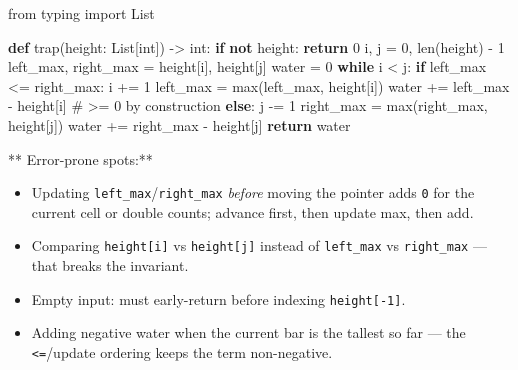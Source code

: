 \documentclass[11pt]{article}
\providecommand{\tightlist}{\setlength{\itemsep}{1pt}\setlength{\parskip}{0pt}}
\newenvironment{Shaded}{\begin{snugshade}}{\end{snugshade}}
\newcommand{\BuiltInTok}[1]{\textcolor[rgb]{0.50,0.55,0.55}{#1}}
\newcommand{\CommentTok}[1]{\textcolor[rgb]{0.48,0.49,0.49}{#1}}
\newcommand{\ControlFlowTok}[1]{\textcolor[rgb]{0.99,0.74,0.29}{\textbf{#1}}}
\newcommand{\DecValTok}[1]{\textcolor[rgb]{0.96,0.45,0.00}{#1}}
\newcommand{\ImportTok}[1]{\textcolor[rgb]{0.15,0.68,0.38}{#1}}
\newcommand{\KeywordTok}[1]{\textcolor[rgb]{0.81,0.81,0.76}{\textbf{#1}}}
\newcommand{\NormalTok}[1]{\textcolor[rgb]{0.81,0.81,0.76}{#1}}
\newcommand{\OperatorTok}[1]{\textcolor[rgb]{0.81,0.81,0.76}{#1}}
\begin{document}
\begin{Shaded}
\begin{Highlighting}[]
\ImportTok{from}\NormalTok{ typing }\ImportTok{import}\NormalTok{ List}

\KeywordTok{def}\NormalTok{ trap(height: List[}\BuiltInTok{int}\NormalTok{]) }\OperatorTok{{-}\textgreater{}} \BuiltInTok{int}\NormalTok{:}
    \ControlFlowTok{if} \KeywordTok{not}\NormalTok{ height:}
        \ControlFlowTok{return} \DecValTok{0}
\NormalTok{    i, j }\OperatorTok{=} \DecValTok{0}\NormalTok{, }\BuiltInTok{len}\NormalTok{(height) }\OperatorTok{{-}} \DecValTok{1}
\NormalTok{    left\_max, right\_max }\OperatorTok{=}\NormalTok{ height[i], height[j]}
\NormalTok{    water }\OperatorTok{=} \DecValTok{0}
    \ControlFlowTok{while}\NormalTok{ i }\OperatorTok{\textless{}}\NormalTok{ j:}
        \ControlFlowTok{if}\NormalTok{ left\_max }\OperatorTok{\textless{}=}\NormalTok{ right\_max:}
\NormalTok{            i }\OperatorTok{+=} \DecValTok{1}
\NormalTok{            left\_max }\OperatorTok{=} \BuiltInTok{max}\NormalTok{(left\_max, height[i])}
\NormalTok{            water }\OperatorTok{+=}\NormalTok{ left\_max }\OperatorTok{{-}}\NormalTok{ height[i]   }\CommentTok{\# \textgreater{}= 0 by construction}
        \ControlFlowTok{else}\NormalTok{:}
\NormalTok{            j }\OperatorTok{{-}=} \DecValTok{1}
\NormalTok{            right\_max }\OperatorTok{=} \BuiltInTok{max}\NormalTok{(right\_max, height[j])}
\NormalTok{            water }\OperatorTok{+=}\NormalTok{ right\_max }\OperatorTok{{-}}\NormalTok{ height[j]}
    \ControlFlowTok{return}\NormalTok{ water}
\end{Highlighting}
\end{Shaded}

** Error-prone spots:**

\begin{itemize}
\tightlist
\item
  Updating \texttt{left\_max}/\texttt{right\_max} \emph{before} moving the pointer adds \texttt{0} for the current cell or double counts; advance first, then update max, then add.
\item
  Comparing \texttt{height{[}i{]}} vs \texttt{height{[}j{]}} instead of \texttt{left\_max} vs \texttt{right\_max} --- that breaks the invariant.
\item
  Empty input: must early-return before indexing \texttt{height{[}-1{]}}.
\item
  Adding negative water when the current bar is the tallest so far --- the \texttt{\textless{}=}/update ordering keeps the term non-negative.
\end{itemize}
\end{document}
